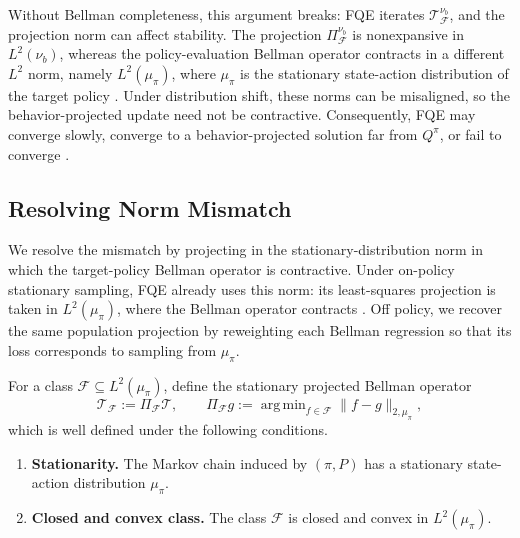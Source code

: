 \documentclass{article}
\DeclareMathOperator*{\argmin}{arg\,min}
\theoremstyle{plain}
\theoremstyle{definition}
\theoremstyle{remark}
\begin{document}
Without Bellman completeness, this argument breaks: FQE iterates
\(\mathcal T_{\mathcal F}^{\nu_b}\), and the projection norm can affect
stability. The projection \(\Pi_{\mathcal F}^{\nu_b}\) is nonexpansive in
\(L^2(\nu_b)\), whereas the policy-evaluation Bellman operator contracts in a
different \(L^2\) norm, namely \(L^2(\mu_\pi)\), where \(\mu_\pi\) is the
stationary state-action distribution of the target policy \citep{tsitsiklis1996analysis}. Under distribution
shift, these norms can be misaligned, so the behavior-projected update need not
be contractive. Consequently, FQE may converge slowly, converge to a
behavior-projected solution far from \(Q^\pi\), or fail to converge
\citep{tsitsiklis1996analysis,de2000existence,patterson2022generalized}.

\subsection{Resolving Norm Mismatch}
\label{sec::stable}

We resolve the mismatch by projecting in the stationary-distribution norm in
which the target-policy Bellman operator is contractive. Under on-policy
stationary sampling, FQE already uses this norm: its least-squares projection is
taken in \(L^2(\mu_\pi)\), where the Bellman operator contracts
\citep{tsitsiklis1996analysis,hallak2016generalized,patterson2022generalized}.
Off policy, we recover the same population projection by reweighting each
Bellman regression so that its loss corresponds to sampling from \(\mu_\pi\).

For a class \(\mathcal F \subseteq L^2(\mu_\pi)\), define the stationary
projected Bellman operator
\begin{equation}
\label{eqn:projbell}
\mathcal T_{\mathcal F} := \Pi_{\mathcal F}\mathcal T,
\qquad
\Pi_{\mathcal F}g
:=
\argmin_{f\in\mathcal F}\|f-g\|_{2,\mu_\pi},
\end{equation}
which is well defined under the following conditions.

\begin{enumerate}[label=\textbf{C\arabic*}, ref={C\arabic*},
leftmargin=1.5em,series=cond]
\item \label{cond::stationary}
\textbf{Stationarity.} The Markov chain induced by \((\pi,P)\) has a
stationary state-action distribution \(\mu_\pi\).

\item \label{cond::convex}
\textbf{Closed and convex class.}
The class \(\mathcal F\) is closed and convex in \(L^2(\mu_\pi)\).
\end{enumerate}
\end{document}
